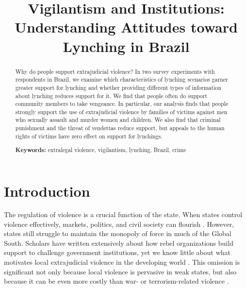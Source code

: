 \documentclass[12pt,a4paper]{article}
\title{Vigilantism and Institutions:\\ Understanding Attitudes toward Lynching in Brazil}
\date{}
\begin{document}
\maketitle

\begin{abstract}
\doublespacing \noindent Why do people support extrajudicial violence? In two survey experiments with respondents in Brazil, we examine which characteristics of lynching scenarios garner greater support for lynching and whether providing different types of information about lynching reduces support for it. We find that people often do support community members to take vengeance. In particular, our analysis finds that people strongly support the use of extrajudicial violence by families of victims against men who sexually assault and murder women and children. We also find that criminal punishment and the threat of vendettas reduce support, but appeals to the human rights of victims have zero effect on support for lynchings. 
\vspace{.25cm}

\noindent \textbf{Keywords:} extralegal violence, vigilantism, lynching, Brazil, crime 
\vspace{.25cm}

\end{abstract}

\newpage

\section{Introduction}
\label{sec:introduction}

\doublespacing

The regulation of violence is a crucial function of the state. When states
control violence effectively, markets, politics, and civil society can flourish
\citep{besley2011pillars, north2009violence}. However, states still struggle to
maintain the monopoly of force in much of the Global South. Scholars have
written extensively about how rebel organizations build support to challenge
government institutions, yet we know little about what motivates local
extrajudicial violence in the developing world \citep{bateson2020politics,
smith2000new}. This omission is significant not only because local violence is
pervasive in weak states, but also because it can be even more costly than war-
or terrorism-related violence \citep{blair2017predicting}. 
\end{document}
